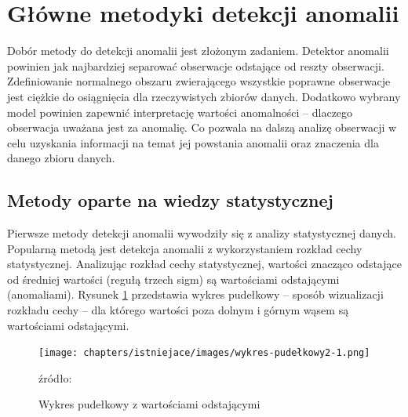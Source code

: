 \section{Główne metodyki detekcji anomalii}
Dobór metody do detekcji anomalii jest złożonym zadaniem. Detektor anomalii powinien jak najbardziej separować obserwacje odstające od reszty obserwacji. Zdefiniowanie normalnego obszaru zwierającego wszystkie poprawne obserwacje jest ciężkie do osiągnięcia dla rzeczywistych zbiorów danych. Dodatkowo wybrany model powinien zapewnić interpretację wartości anomalności -- dlaczego obserwacja uważana jest za anomalię. Co pozwala na dalszą analizę obserwacji w celu uzyskania informacji na temat jej powstania anomalii oraz znaczenia dla danego zbioru danych. 
\subsection {Metody oparte na wiedzy statystycznej}
Pierwsze metody detekcji anomalii wywodziły się z analizy statystycznej danych. Popularną metodą jest detekcja anomalii z wykorzystaniem rozkład cechy statystycznej. Analizując rozkład cechy statystycznej, wartości znacząco odstające od średniej wartości (regułą trzech sigm) są wartościami odstającymi (anomaliami). Rysunek \ref{fig:pudleko} przedstawia wykres pudełkowy -- sposób wizualizacji rozkładu cechy -- dla którego wartości poza dolnym i górnym wąsem są wartościami odstającymi. 
\begin{figure}[h!]
    \centering
    \texttt{[image: chapters/istniejace/images/wykres-pudełkowy2-1.png]}
    \caption{Wykres pudełkowy z wartościami odstającymi}
    \footnotesize{źródło: \cite{pudelko}}
    \label{fig:pudleko}
\end{figure}

